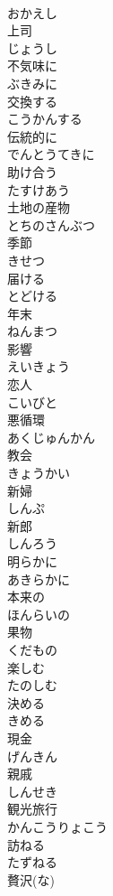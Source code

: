 \documentclass[8pt]{extreport}
\begin{document}
\begin{CJK}{UTF8}{min}
\\	おかえし
\\	上司	
\\	じょうし
\\	不気味に	
\\	ぶきみに
\\	交換する	
\\	こうかんする
\\	伝統的に	
\\	でんとうてきに
\\	助け合う	
\\	たすけあう
\\	土地の産物	
\\	とちのさんぶつ
\\	季節	
\\	きせつ
\\	届ける	
\\	とどける
\\	年末	
\\	ねんまつ
\\	影響	
\\	えいきょう
\\	恋人	
\\	こいびと
\\	悪循環	
\\	あくじゅんかん
\\	教会	
\\	きょうかい
\\	新婦	
\\	しんぷ
\\	新郎	
\\	しんろう
\\	明らかに	
\\	あきらかに
\\	本来の	
\\	ほんらいの
\\	果物	
\\	くだもの
\\	楽しむ	
\\	たのしむ
\\	決める	
\\	きめる
\\	現金	
\\	げんきん
\\	親戚	
\\	しんせき
\\	観光旅行	
\\	かんこうりょこう
\\	訪ねる	
\\	たずねる
\\	贅沢(な)	

\end{CJK}
\end{document}
